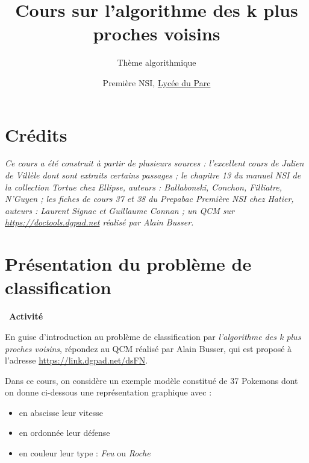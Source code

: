 \documentclass[
  11pt,
]{article}
\title{Cours sur l'algorithme des k plus proches voisins}
\subtitle{Thème algorithmique}
\author{Première NSI, \href{https://frederic-junier.org/}{Lycée du
Parc}}
\date{}
\providecommand{\tightlist}{%
  \setlength{\itemsep}{0pt}\setlength{\parskip}{0pt}}
\newcounter{thme}
\newcounter{prop}
\newcounter{activite}
\newenvironment{activite}[1]
{\par \medskip   \noindent   \addtocounter{activite}{1}
\begin{bclogo}[arrondi =0.1,   noborder = true, logo=\bcvelo, marge=4]{~\textbf{Activité} \textbf{\theactivite} {\itshape #1} }  \par}
{
\end{bclogo}
 \par \bigskip }
\newcounter{cours}
\newcounter{alg}
\begin{document}
\maketitle

\renewcommand*\contentsname{Table des matières}
{
\hypersetup{linkcolor=}
\setcounter{tocdepth}{3}
\tableofcontents
}
\hypertarget{cruxe9dits}{%
\section*{Crédits}\label{cruxe9dits}}

\emph{Ce cours a été construit à partir de plusieurs sources :
l'excellent cours de Julien de Villèle dont sont extraits certains
passages ; le chapitre 13 du manuel NSI de la collection Tortue chez
Ellipse, auteurs : Ballabonski, Conchon, Filliatre, N'Guyen ; les fiches
de cours 37 et 38 du Prepabac Première NSI chez Hatier, auteurs :
Laurent Signac et Guillaume Connan ; un QCM sur
\url{https://doctools.dgpad.net} réalisé par Alain Busser.}

\hypertarget{pruxe9sentation-du-probluxe8me-de-classification}{%
\section{Présentation du problème de
classification}\label{pruxe9sentation-du-probluxe8me-de-classification}}

\begin{activite}{}

En guise d'introduction au problème de classification par
\emph{l'algorithme des k plus proches voisins}, répondez au QCM réalisé
par Alain Busser, qui est proposé à l'adresse
\url{https://link.dgpad.net/dsFN}.

\end{activite}

Dans ce cours, on considère un exemple modèle constitué de 37 Pokemons
dont on donne ci-dessous une représentation graphique avec :

\begin{itemize}
\tightlist
\item
  en abscisse leur vitesse
\item
  en ordonnée leur défense
\item
  en couleur leur type : \emph{Feu} ou \emph{Roche}
\end{itemize}
\end{document}
